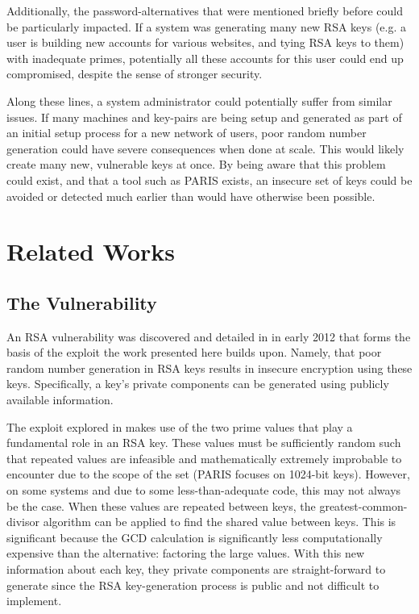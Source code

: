 \documentclass[smallextended]{svjour3}       %
\begin{document}
Additionally, the password-alternatives that were mentioned briefly before
could be particularly impacted. If a system was generating many new RSA keys
(e.g. a user is building new accounts for various websites, and tying RSA keys
to them) with inadequate primes, potentially all these accounts for this user
could end up compromised, despite the sense of stronger security.

Along these lines, a system administrator could potentially suffer from similar
issues. If many machines and key-pairs are being setup and generated as part of
an initial setup process for a new network of users, poor random number
generation could have severe consequences when done at scale. This would likely
create many new, vulnerable keys at once. By being aware that this problem
could exist, and that a tool such as PARIS exists, an insecure set of keys 
could be avoided or detected much earlier than would have otherwise been
possible.  


\section{Related Works}
\label{sec:related}

\subsection{The Vulnerability}
\label{subsec:vuln}
An RSA vulnerability was discovered and detailed in \cite{lenstra2012ron} in
early 2012 that forms the basis of the exploit the work presented here builds
upon. Namely, that poor random number generation in RSA keys results in
insecure encryption using these keys. Specifically, a key's private components
can be generated using publicly available information.

The exploit explored in \cite{lenstra2012ron} makes use of the two prime
values that play a fundamental role in an RSA key. These values must be
sufficiently random such that repeated values are infeasible and mathematically
extremely improbable to encounter due to the scope of the set (PARIS focuses on
1024-bit keys). However, on some systems and due to some less-than-adequate
code, this may not always be the case. When these values are repeated between
keys, the greatest-common-divisor algorithm can be applied to find the shared
value between keys. This is significant because the GCD calculation is
significantly less computationally expensive than the alternative: factoring
the large values. With this new information about each key, they private
components are straight-forward to generate since the RSA key-generation
process is public and not difficult to implement.  
\end{document}

